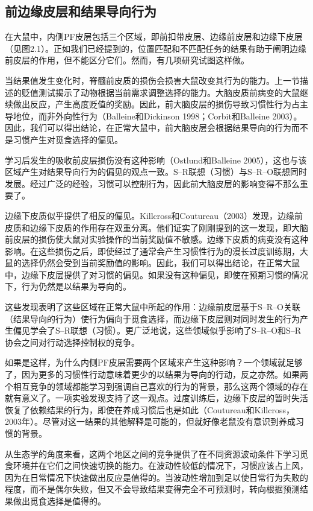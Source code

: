 \subsection{前边缘皮层和结果导向行为}
在大鼠中，内侧PF皮层包括三个区域，即前扣带皮层、边缘前皮层和边缘下皮层（见图2.1）。正如我们已经提到的，位置匹配和不匹配任务的结果有助于阐明边缘前皮层的作用，但不能区分它们。然而，有几项研究试图这样做。\par
当结果值发生变化时，脊髓前皮质的损伤会损害大鼠改变其行为的能力。上一节描述的贬值测试揭示了动物根据当前需求调整选择的能力。大脑皮质前病变的大鼠继续做出反应，产生高度贬值的奖励。因此，前大脑皮层的损伤导致习惯性行为占主导地位，而非外向性行为（Balleine和Dickinson 1998；Corbit和Balleine 2003）。因此，我们可以得出结论，在正常大鼠中，前大脑皮层会根据结果导向的行为而不是习惯产生对觅食选择的偏见。\par
学习后发生的吸收前皮层损伤没有这种影响（Ostlund和Balleine 2005），这也与该区域产生对结果导向行为的偏见的观点一致。S–R联想（习惯）与S–R–O联想同时发展。经过广泛的经验，习惯可以控制行为，因此前大脑皮层的影响变得不那么重要了。\par
边缘下皮质似乎提供了相反的偏见。Killcross和Coutureau（2003）发现，边缘前皮质和边缘下皮质的作用存在双重分离。他们证实了刚刚提到的这一发现，即大脑前皮层的损伤使大鼠对实验操作的当前奖励值不敏感。边缘下皮质的病变没有这种影响。在这些损伤之后，即使经过了通常会产生习惯性行为的漫长过度训练期，大鼠的选择仍然会受到当前奖励值的影响。因此，我们可以得出结论，在正常大鼠中，边缘下皮层提供了对习惯的偏见。如果没有这种偏见，即使在预期习惯的情况下，行为仍然是以结果为导向的。\par
这些发现表明了这些区域在正常大鼠中所起的作用：边缘前皮层基于S–R–O关联（结果导向的行为）使行为偏向于觅食选择，而边缘下皮层则对同时发生的行为产生偏见学会了S–R联想（习惯）。更广泛地说，这些领域似乎影响了S–R–O和S–R协会之间对行动选择控制权的竞争。\par
如果是这样，为什么内侧PF皮层需要两个区域来产生这种影响？一个领域就足够了，因为更多的习惯性行动意味着更少的以结果为导向的行动，反之亦然。如果两个相互竞争的领域都能学习到强调自己喜欢的行为的背景，那么这两个领域的存在就有意义了。一项实验发现支持了这一观点。过度训练后，边缘下皮层的暂时失活恢复了依赖结果的行为，即使在养成习惯后也是如此（Coutureau和Killcross，2003年）。尽管对这一结果的其他解释是可能的，但就好像老鼠没有意识到养成习惯的背景。\par
从生态学的角度来看，这两个地区之间的竞争提供了在不同资源波动条件下学习觅食环境并在它们之间快速切换的能力。在波动性较低的情况下，习惯应该占上风，因为在日常情况下快速做出反应是值得的。当波动性增加到足以使日常行为失败的程度，而不是偶尔失败，但又不会导致结果变得完全不可预测时，转向根据预测结果做出觅食选择是值得的。\par
